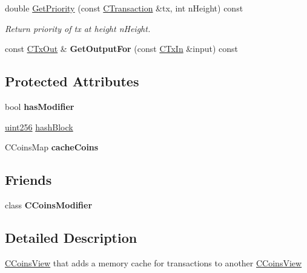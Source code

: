 \begin{DoxyCompactItemize}
\mbox{\label{class_c_coins_view_cache_a111d5a94709eaccd57bafe6ab1d938af}} 
double \mbox{\hyperlink{class_c_coins_view_cache_a111d5a94709eaccd57bafe6ab1d938af}{Get\+Priority}} (const \mbox{\hyperlink{class_c_transaction}{C\+Transaction}} \&tx, int n\+Height) const
\begin{DoxyCompactList}\small\item\em Return priority of tx at height n\+Height. \end{DoxyCompactList}\item 
\mbox{\label{class_c_coins_view_cache_a54a0de51586fa92d83cfa321fb8936c5}} 
const \mbox{\hyperlink{class_c_tx_out}{C\+Tx\+Out}} \& {\bfseries Get\+Output\+For} (const \mbox{\hyperlink{class_c_tx_in}{C\+Tx\+In}} \&input) const
\end{DoxyCompactItemize}
\subsection*{Protected Attributes}
\begin{DoxyCompactItemize}
\item 
\mbox{\label{class_c_coins_view_cache_a363e27234d36bb0fc533d60cd64d1bc3}} 
bool {\bfseries has\+Modifier}
\item 
\mbox{\hyperlink{classuint256}{uint256}} \mbox{\hyperlink{class_c_coins_view_cache_a229dddddbc5501edc250209a2ce5df8b}{hash\+Block}}
\item 
\mbox{\label{class_c_coins_view_cache_af33cc2c6d38af65ac833d4d13c8e3764}} 
C\+Coins\+Map {\bfseries cache\+Coins}
\end{DoxyCompactItemize}
\subsection*{Friends}
\begin{DoxyCompactItemize}
\item 
\mbox{\label{class_c_coins_view_cache_ae6ce8219acb79950bced74cb108acacf}} 
class {\bfseries C\+Coins\+Modifier}
\end{DoxyCompactItemize}


\subsection{Detailed Description}
\mbox{\hyperlink{class_c_coins_view}{C\+Coins\+View}} that adds a memory cache for transactions to another \mbox{\hyperlink{class_c_coins_view}{C\+Coins\+View}} 

